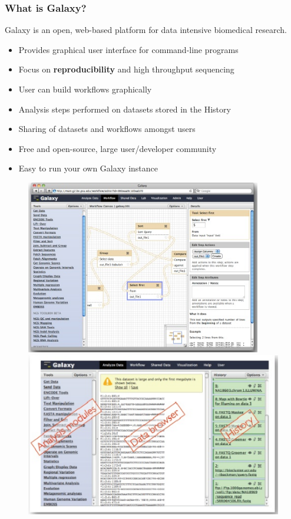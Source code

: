 \documentclass{beamer}              %
\begin{document}
\begin{frame}
    \frametitle{What is Galaxy?}
	Galaxy is an open, web-based platform for data intensive biomedical research.
	\begin{itemize}
		\item Provides graphical user interface for command-line programs
		\item Focus on \textbf{reproducibility} and high throughput sequencing
		\item User can build workflows graphically
		\item Analysis steps performed on datasets stored in the History
		\item Sharing of datasets and workflows amongst users
		\item Free and open-source, large user/developer community
		\item Easy to run your own Galaxy instance
	\end{itemize}
	\begin{figure}
		\includegraphics[height=0.25\textheight]{figures/101p_01a.png} \qquad\qquad
		\includegraphics[height=0.25\textheight]{figures/101p_01b.png}
	\end{figure}
\end{frame}
\end{document}
